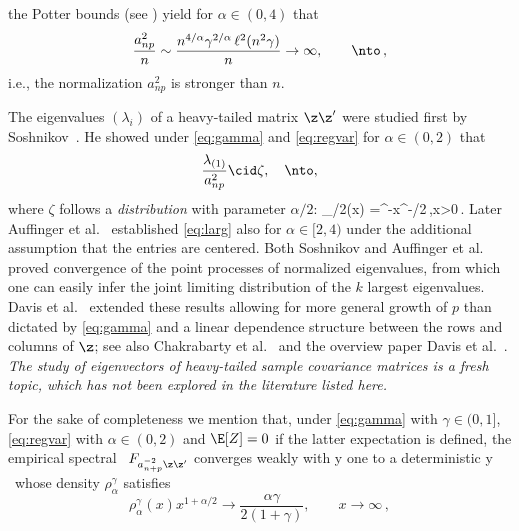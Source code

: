 the Potter bounds (see \cite[p.~25]{bingham:goldie:teugels:1987}) yield for $\alpha\in (0,4)$ that
\begin{equation}\label{eq:toinf}
 \frac{a_{np}^2}{n} \sim \frac{n^{4/\alpha} \gamma^{2/\alpha}\,\ell^2(n^2 \gamma)}{n} \to \infty, \qquad \nto\,,
\end{equation}
i.e., the normalization $a_{np}^2$ is stronger than $n$.
\par
The eigenvalues $(\lambda_i)$ of a heavy-tailed matrix $\z\z'$ were 
studied first by Soshnikov~\cite{soshnikov:2004,soshnikov:2006}. He showed under 
\eqref{eq:gamma} and \eqref{eq:regvar} for $\alpha \in (0,2)$ that  
\begin{equation}\label{eq:larg}
\dfrac{\lambda_{(1)}}{a_{np}^2} \cid \zeta, \quad \nto,
\end{equation}
where $\zeta$ follows a {\em \Frechet distribution} with parameter $\alpha/2$:
\beao
\Phi_{\alpha/2}(x) =\ex^{-x^{-\alpha/2}}\,,\qquad x>0\,.
\eeao
Later Auffinger et al.~\cite{auffinger:arous:peche:2009} established \eqref{eq:larg} also for $\alpha \in [2,4)$ 
under the additional assumption that the entries are centered. 
Both Soshnikov \cite{soshnikov:2004,soshnikov:2006}
and Auffinger et al.~\cite{auffinger:arous:peche:2009} proved convergence of the point processes of normalized eigenvalues, 
from which one can easily infer the joint limiting distribution of the $k$ largest eigenvalues.  
Davis et al.~\cite{davis:mikosch:pfaffel:2016,davis:pfaffel:stelzer:2014} 
extended these results allowing for more general growth of $p$ 
than dictated by \eqref{eq:gamma} and a linear dependence structure between the rows and columns of $\z$; see also Chakrabarty et al.~\cite{chakrabarty:hazra:roy:20013} and the overview
paper Davis et al.~\cite{davis:mikosch:heiny:xie:2015}. {\em The study of eigenvectors of heavy-tailed sample covariance matrices is a fresh topic, which has not been explored in the literature listed here.}
\par
For the sake of completeness we mention 
that, under \eqref{eq:gamma} with $\gamma\in (0,1]$,  
\eqref{eq:regvar} with $\alpha\in (0,2)$ and $\E[Z]=0$ if the latter expectation is defined,
the empirical spectral \ds\ $F_{a_{n+p}^{-2}\z \z'}$ converges weakly with \pro y one to a deterministic 
\pro y \ms\ whose density $\rho_{\alpha}^\gamma$ satisfies
\begin{equation*}
\rho_{\alpha}^\gamma(x) x^{1+\alpha/2} \to \frac{\alpha \gamma}{2(1+\gamma)}, \qquad x \to \infty\,,
\end{equation*}
